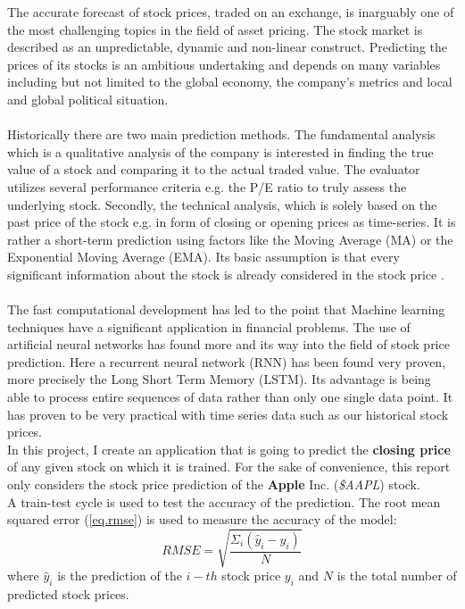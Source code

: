 \documentclass[fleqn,10pt]{SelfArx} %
\begin{document}
The accurate forecast of stock prices, traded on an exchange, is inarguably one of the most challenging topics in the field of asset pricing. The stock market is described as an unpredictable, dynamic and non-linear construct. Predicting the prices of its stocks is an ambitious undertaking and depends on many variables including but not limited to the global economy, the company's metrics and local and global political situation. 
\\
\\
Historically there are two main prediction methods. The fundamental analysis which is a qualitative analysis of the company is interested in finding the true value of a stock and comparing it to the actual traded value. The evaluator utilizes several performance criteria e.g. the P/E ratio to truly assess the underlying stock. Secondly, the technical analysis, which is solely based on the past price of the stock e.g. in form of closing or opening prices as time-series. It is rather a short-term prediction using factors like the Moving Average (MA) or the Exponential Moving Average (EMA). Its basic assumption is that every significant information about the stock is already considered in the stock price \cite{prediction}.
\\
\\
The fast computational development has led to the point that Machine learning techniques have a significant application in financial problems. The use of artificial neural networks has found more and its way into the field of stock price prediction. Here a recurrent neural network (RNN) has been found very proven, more precisely the Long Short Term Memory (LSTM). Its advantage is being
able to process entire sequences of data rather than only one single data point. It has proven to be very practical with time series data such as our historical stock prices. 
\\
In this project, I create an application that is going to predict the \textbf{closing price} of any given stock on which it is trained. For the sake of convenience, this report only considers the stock price prediction of the \textbf{Apple} Inc. (\textit{\$AAPL}) stock.
\\
A train-test cycle is used to test the accuracy of the prediction. The root mean squared error (\ref{eq.rmse}) is used to measure the accuracy of the model:
\begin{equation}
RMSE = \sqrt{\dfrac{\Sigma_{i}(\hat{y}_i-y_i)}{N}} 
\label{eq.rmse}
\end{equation}
where $\hat{y}_i$ is the prediction of the $i-th$ stock price $y_i$ and $N$ is the total number of predicted stock prices.
\end{document}
